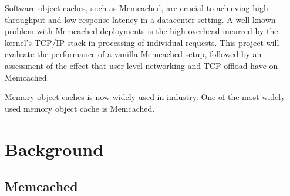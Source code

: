 \documentclass[bsc,frontabs,twoside,singlespacing,parskip,deptreport]{infthesis}     %
\begin{document}
Software object caches, such as Memcached, are crucial to achieving high throughput and low response latency in a datacenter setting. A well-known problem with Memcached deployments is the high overhead incurred by the kernel's TCP/IP stack in processing of individual requests. This project will evaluate the performance of a vanilla Memcached setup, followed by an assessment of the effect that user-level networking and TCP offload have on Memcached. 

Memory object caches is now widely used in industry. One of the most widely used memory object cache is Memcached. 






%
%
%










\chapter{Background}

\section{Memcached}
\end{document}
